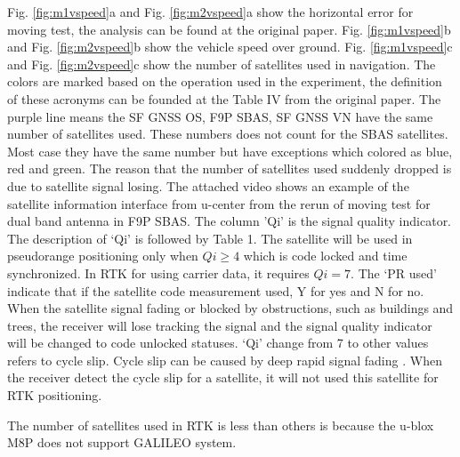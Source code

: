 \documentclass[letterpaper, 10 pt,onecolumn]{article}
\begin{document}
	Fig. \ref{fig:m1vspeed}a and Fig. \ref{fig:m2vspeed}a show the horizontal error for moving test, the analysis can be found at the original paper. Fig. \ref{fig:m1vspeed}b and Fig. \ref{fig:m2vspeed}b show the vehicle speed over ground. Fig. \ref{fig:m1vspeed}c and Fig. \ref{fig:m2vspeed}c show the number of satellites used in navigation. The colors are marked based on the operation used in the experiment, the definition of these acronyms can be founded at the Table IV from the original paper. The purple line means the SF GNSS OS, F9P SBAS, SF GNSS VN have the same number of satellites used. These numbers does not count for the SBAS satellites.
	Most case they have the same number but have exceptions which colored as blue, red and green. The reason that the number of satellites used suddenly dropped is due to satellite signal losing. The attached video shows an example of the satellite information interface from u-center from the rerun of moving test for dual band antenna in F9P SBAS. The column 'Qi' is the signal quality indicator. The description of `Qi' is followed by Table 1. The satellite will be used in pseudorange positioning only when $Qi \geq 4$ which is code locked and time synchronized. In RTK for using carrier data, it requires $Qi = 7$. The `PR used' indicate that if the satellite code measurement used, Y for yes and N for no. When the satellite signal fading or blocked by obstructions, such as buildings and trees, the receiver will lose tracking the signal and the signal quality indicator will be changed to code unlocked statuses. `Qi' change from 7 to other values refers to cycle slip. Cycle slip can be caused by deep rapid signal fading \cite{sennott1992use}. When the receiver detect the cycle slip for a satellite, it will not used this satellite for RTK positioning.
	
	The number of satellites used in RTK is less than others is because the u-blox M8P does not support GALILEO system.
	
\end{document}
